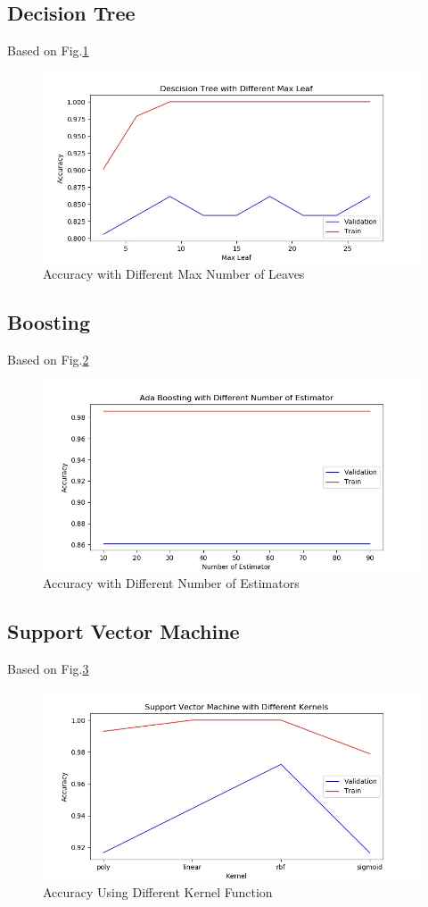 \documentclass[11pt]{article}
\begin{document}
\subsection{Decision Tree}
Based on Fig.\ref{fig:wine_dt}
\begin{figure}[h!]
  \includegraphics[width=\linewidth]{./wine/dt_maxleaf.jpg}
  \caption{Accuracy with Different Max Number of Leaves}
  \label{fig:wine_dt}
\end{figure}
\subsection{Boosting}
Based on Fig.\ref{fig:wine_ada}
\begin{figure}[h!]
  \includegraphics[width=\linewidth]{./wine/ada_num_estimator.jpg}
  \caption{Accuracy with Different Number of Estimators}
  \label{fig:wine_ada}
\end{figure}
\subsection{Support Vector Machine}
Based on Fig.\ref{fig:wine_svm}
\begin{figure}[h!]
  \includegraphics[width=\linewidth]{./wine/svm_kernel.jpg}
  \caption{Accuracy Using Different Kernel Function}
  \label{fig:wine_svm}
\end{figure}
\end{document}
